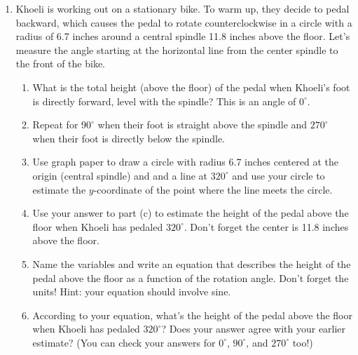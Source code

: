 \begin{enumerate} 
\item %
Khoeli is working out on a stationary bike.  To warm up, they decide to pedal backward, which causes the pedal to rotate counterclockwise in a circle with a radius of 6.7 inches around a central spindle 11.8 inches above the floor. Let's measure the angle starting at the horizontal line from the center spindle to the front of the bike.
\begin{enumerate}
    \item What is the total height (above the floor) of the pedal when Khoeli's foot is directly forward, level with the spindle?  This is an angle of $0^\circ$.
    \item Repeat for $90^\circ$ when their foot is straight above the spindle and $270^\circ$ when their foot is directly below the spindle.
    \item Use graph paper to draw a circle with radius 6.7 inches centered at the origin (central spindle) and and a line at $320^\circ$ and use your circle to estimate the $y$-coordinate of the point where the line meets the circle.
    \item Use your answer to part (c) to estimate the height of the pedal above the floor when Khoeli has pedaled $320^\circ$. Don't forget the center is 11.8 inches above the floor.
    \item Name the variables and write an equation that describes the height of the pedal above the floor as a function of the rotation angle. Don't forget the units! Hint: your equation should involve sine.
    \item According to your equation, what's the height of the pedal above the floor when Khoeli has pedaled $320^\circ$?  Does your answer agree with your earlier estimate?  (You can check your answers for $0^\circ$, $90^\circ$, and $270^\circ$ too!)
\end{enumerate}


\end{enumerate}
